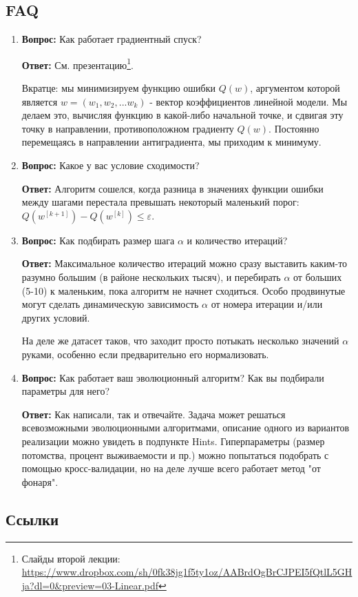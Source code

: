 \documentclass[a4paper, unicode]{article}
\begin{document}
\subsection{FAQ}
\label{sec:orgheadline10}
\begin{enumerate}
\item \textbf{Вопрос:}
   Как работает градиентный спуск?

\textbf{Ответ:}
См. презентацию\footnote{Слайды второй лекции: \url{https://www.dropbox.com/sh/0fk38jg1f5ty1oz/AABrdOgBrCJPEI5fQtlL5GHja?dl=0&preview=03-Linear.pdf}}.

Вкратце: мы минимизируем функцию ошибки \(Q(w)\), аргументом которой является
\(w = (w_1, w_2, ... w_k)\) - вектор коэффициентов линейной модели. Мы делаем
это, вычисляя функцию в какой-либо начальной точке, и сдвигая эту точку в
направлении, противоположном градиенту \(Q(w)\). Постоянно перемещаясь в
направлении антиградиента, мы приходим к минимуму.

\item \textbf{Вопрос:}
   Какое у вас условие сходимости?

\textbf{Ответ:}
Алгоритм сошелся, когда разница в значениях функции ошибки между шагами
перестала превышать некоторый маленький порог:
\(Q(w^{[k+1]}) - Q(w^{[k]}) \leqslant \varepsilon\).

\item \textbf{Вопрос:}
   Как подбирать размер шага \(\alpha\) и количество итераций?

\textbf{Ответ:}
Максимальное количество итераций можно сразу выставить каким-то разумно
большим (в районе нескольких тысяч), и перебирать \(\alpha\) от больших (5-10)
к маленьким, пока алгоритм не начнет сходиться. Особо продвинутые могут
сделать динамическую зависимость \(\alpha\) от номера итерации и/или других
условий.

На деле же датасет таков, что заходит просто потыкать несколько значений
\(\alpha\) руками, особенно если предварительно его нормализовать.

\item \textbf{Вопрос:}
   Как работает ваш эволюционный алгоритм? Как вы подбирали параметры для него?

\textbf{Ответ:}
Как написали, так и отвечайте. Задача может решаться всевозможными
эволюционными алгоритмами, описание одного из вариантов реализации можно
увидеть в подпункте Hints. Гиперпараметры (размер потомства, процент
выживаемости и пр.) можно попытаться подобрать с помощью кросс-валидации, но
на деле лучше всего работает метод "от фонаря".
\end{enumerate}
\subsection{Ссылки}
\label{sec:orgheadline11}
\end{document}
